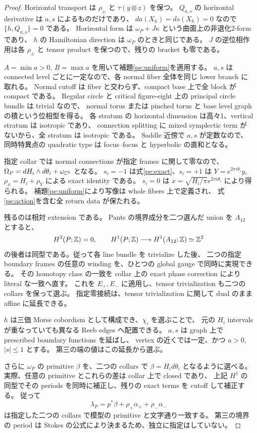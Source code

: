 \begin{proof}
Horizontal transport は $\rho_\pm$ と $\tau(y\otimes z)$ を保つ。
$Q_{a,s}$ の horizontal derivative は $a,s$ によるものだけであり、
$da(X_h)=ds(X_h)=0$ なので $\{h,Q_{a,s}\}=0$ である。
Horizontal form は $\omega_P+J\kappa$ という曲面上の非退化2-form であり、
$h$ の Hamiltonian direction は $\omega_P$ のときと同じである。
$J$ の逆位相作用は各 $\rho_\pm$ と tensor product を保つので、残りの bracket も零である。

$A=\min a>0$, $B=\max a$ を用いて補題\ref{pe:uniform}を適用する。
$a,s$ は connected level ごとに一定なので、各 normal fiber 全体を同じ lower branch に取れる。
Normal cutoff は fiber と交わらず、compact base 上で全 block が compact である。
Regular circle と critical figure-eight 上の principal circle bundle は trivial なので、
normal torus または pinched torus と base level graph の積という位相型を得る。
各 stratum の horizontal dimension は高々1、vertical stratum は isotropic であり、
connection splitting に mixed symplectic term がないから、全 stratum は isotropic である。
Saddle 近傍で $a,s$ が定数なので、同時特異点の quadratic type は focus--focus と hyperbolic の直和となる。

指定 collar では normal connections が指定 frames に関して零なので、
$\Omega_P=dH_i\wedge d\theta_i+\omega_{\mathbb C^2}$ となる。
$s_i=-1$ は式\eqref{pe:exact}、$s_i=+1$ は
$Y=e^{2\pi i\theta_i}y$, $\rho_x=H_i+\rho_Y$ による exact identity である。
$s_i=0$ は $x=\sqrt{H_i/\pi}e^{2\pi i\theta_i}$ により得られる。
補題\ref{pe:uniform}により写像は whole fibers 上で定義され、
式\eqref{pe:action}を含む全 return data が保たれる。

残るのは相対 extension である。
Pants の境界成分を二つ選んだ union を $A_{12}$ とすると、
\[
 H^2(P;\mathbb Z)=0,\qquad
 H^1(P;\mathbb Z)\longrightarrow H^1(A_{12};\mathbb Z)\simeq\mathbb Z^2
\]
の後者は同型である。従って各 line bundle を trivialize した後、
二つの指定 boundary frames の任意の winding を、ひとつの global gauge で同時に実現できる。
その homotopy class の一致を collar 上の exact phase correction により literal な一致へ直す。
これを $E_+,E_-$ に適用し、tensor trivialization も二つの collars を保って選ぶ。
指定零接続は、tensor trivialization に関して dual のまま affine に延長できる。

$h$ は三価 Morse cobordism として構成でき、$\chi_i$ を選ぶことで、
元の $H_i$ intervals が重なっていても異なる Reeb edges へ配置できる。
$a,s$ は graph 上で prescribed boundary functions を延ばし、
vertex の近くでは一定、かつ $a>0$, $|s|\le1$ とする。
第三の端の値はこの延長から選ぶ。

さらに $\omega_P$ の primitive $\beta$ を、二つの collars で
$\beta=H_i d\theta_i$ となるように選べる。
実際、任意の primitive とこれらの差は collar 上で closed であり、
上記 $H^1$ の同型でその periods を同時に補正し、残りの exact terms を cutoff して補正する。
従って
\[
 \lambda_P=p^*\beta+\rho_+\alpha_++\rho_-\alpha_-
\]
は指定した二つの collars で模型の primitive と文字通り一致する。
第三の境界の period は Stokes の公式により決まるため、独立に指定はしていない。
\end{proof}

